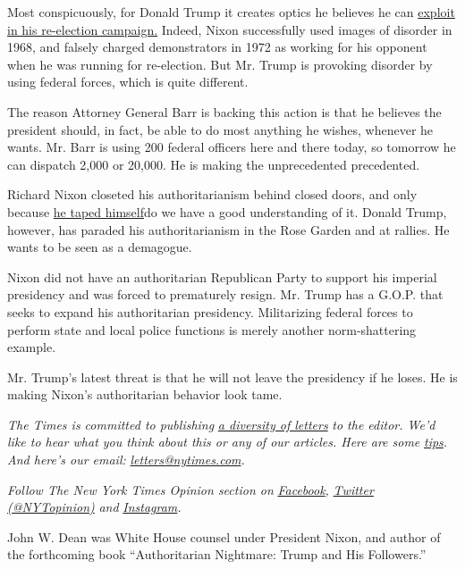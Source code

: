 Most conspicuously, for Donald Trump it creates optics he believes he
can
\href{https://www.nytimes.com/2020/07/21/us/politics/trump-portland-federal-agents.html}{exploit
in his re-election campaign.} Indeed, Nixon successfully used images of
disorder in 1968, and falsely charged demonstrators in 1972 as working
for his opponent when he was running for re-election. But Mr. Trump is
provoking disorder by using federal forces, which is quite different.

The reason Attorney General Barr is backing this action is that he
believes the president should, in fact, be able to do most anything he
wishes, whenever he wants. Mr. Barr is using 200 federal officers here
and there today, so tomorrow he can dispatch 2,000 or 20,000. He is
making the unprecedented precedented.

Richard Nixon closeted his authoritarianism behind closed doors, and
only because \href{http://nixontapes.org/}{he taped himself}do we have a
good understanding of it. Donald Trump, however, has paraded his
authoritarianism in the Rose Garden and at rallies. He wants to be seen
as a demagogue.

Nixon did not have an authoritarian Republican Party to support his
imperial presidency and was forced to prematurely resign. Mr. Trump has
a G.O.P. that seeks to expand his authoritarian presidency. Militarizing
federal forces to perform state and local police functions is merely
another norm-shattering example.

Mr. Trump's latest threat is that he will not leave the presidency if he
loses. He is making Nixon's authoritarian behavior look tame.

\emph{The Times is committed to publishing}
\href{https://www.nytimes.com/2019/01/31/opinion/letters/letters-to-editor-new-york-times-women.html}{\emph{a
diversity of letters}} \emph{to the editor. We'd like to hear what you
think about this or any of our articles. Here are some}
\href{https://help.nytimes.com/hc/en-us/articles/115014925288-How-to-submit-a-letter-to-the-editor}{\emph{tips}}\emph{.
And here's our email:}
\href{mailto:letters@nytimes.com}{\emph{letters@nytimes.com}}\emph{.}

\emph{Follow The New York Times Opinion section on}
\href{https://www.facebook.com/nytopinion}{\emph{Facebook}}\emph{,}
\href{http://twitter.com/NYTOpinion}{\emph{Twitter (@NYTopinion)}}
\emph{and}
\href{https://www.instagram.com/nytopinion/}{\emph{Instagram}}\emph{.}

John W. Dean was White House counsel under President Nixon, and author
of the forthcoming book ``Authoritarian Nightmare: Trump and His
Followers.''

